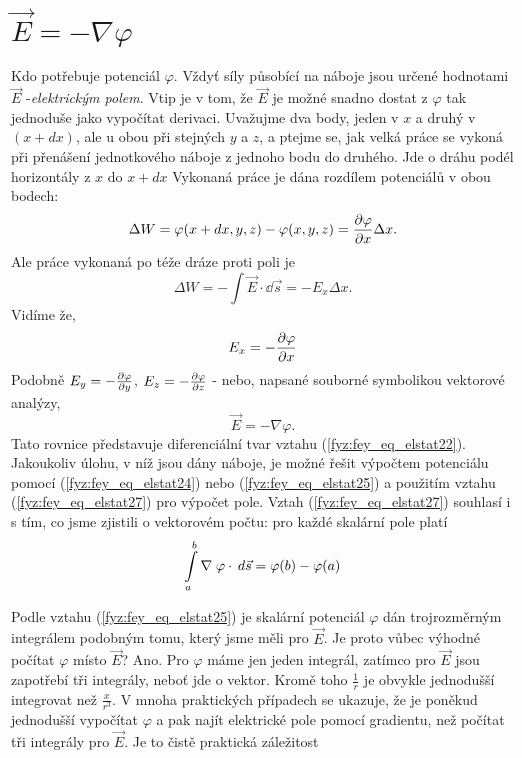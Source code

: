   \section{\texorpdfstring{\(\vec{E} = -\nabla\varphi\)}{Gradient potenciálu}}     
    \cite[s.~70]{Feynman02} Kdo potřebuje potenciál \(\varphi\). Vždyť síly působící na náboje jsou 
    určené hodnotami \(\vec{E}\) -\emph{elektrickým polem}. Vtip je v tom, že \(\vec{E}\) je možné 
    snadno dostat z \(\varphi\) tak jednoduše jako vypočítat derivaci. Uvažujme dva body, jeden v 
    \(x\) a druhý v \((x + dx)\), ale u obou při stejných \(y\) a \(z\), a ptejme se, jak velká 
    práce se vykoná při přenášení jednotkového náboje z jednoho bodu do druhého. Jde o dráhu podél 
    horizontály z \(x\) do \(x + dx\) Vykonaná práce je dána rozdílem potenciálů v obou bodech:
    \begin{equation*}
     \Delta W = \varphi(x+dx, y, z) - \varphi(x, y, z) = \frac{\partial \varphi}{\partial x}\Delta x.
    \end{equation*}
    Ale práce vykonaná po téže dráze proti poli je
    \begin{equation*}
     \Delta W = - \int\vec{E}\cdot\dd{\vec{s}} = - E_x \Delta x.
    \end{equation*}
    Vidíme že,
    \begin{equation}\label{fyz:fey_eq_elstat26}
    E_x = -\frac{\partial \varphi}{\partial x}
    \end{equation}
    Podobně \(E_y = -\frac{\partial \varphi}{\partial y}\), \(E_z = -\frac{\partial \varphi}{\partial z}\) - nebo, napsané souborné 
    symbolikou vektorové analýzy,
    \begin{equation}\label{fyz:fey_eq_elstat27}
    \vec{E} = -\nabla\varphi.
    \end{equation}    
    Tato rovnice představuje diferenciální tvar vztahu (\ref{fyz:fey_eq_elstat22}). Jakoukoliv 
    úlohu, v níž jsou dány náboje, je možné řešit výpočtem potenciálu pomocí 
    (\ref{fyz:fey_eq_elstat24}) nebo (\ref{fyz:fey_eq_elstat25}) a použitím vztahu 
    (\ref{fyz:fey_eq_elstat27}) pro výpočet pole. Vztah (\ref{fyz:fey_eq_elstat27}) souhlasí i s 
    tím, co jsme zjistili o vektorovém počtu: pro každé skalární pole platí
    \begin{equation}\label{fyz:fey_eq_elstat28}
     \int\limits_{a}^{b}\nabla\;\varphi\cdot\hspace{2pt}d\vec{s} = \varphi(b) - \varphi(a)
    \end{equation}     
    
    Podle vztahu (\ref{fyz:fey_eq_elstat25}) je skalární potenciál \(\varphi\) dán trojrozměrným 
    integrálem podobným tomu, který jsme měli pro \(\vec{E}\). Je proto vůbec výhodné počítat 
    \(\varphi\) místo \(\vec{E}\)? Ano. Pro \(\varphi\) máme jen jeden integrál, zatímco pro 
    \(\vec{E}\) jsou zapotřebí tři integrály, neboť jde o vektor. Kromě toho \(\frac{1}{r}\) je 
    obvykle jednodušší integrovat než \(\frac{x}{r^3}\). V mnoha praktických případech se ukazuje, 
    že je poněkud jednodušší vypočítat \(\varphi\) a pak najít elektrické pole pomocí gradientu, než 
    počítat tři integrály pro \(\vec{E}\). Je to čistě praktická záležitost
    
